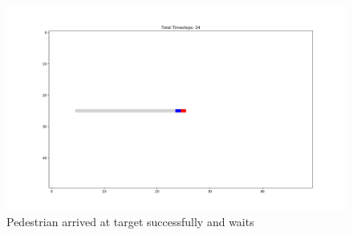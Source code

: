 \documentclass[10pt,a4paper]{article}
\begin{document}
\begin{figure}
    \centering
    \includegraphics[width=\textwidth]{pictures/End.png}
    \caption{Pedestrian arrived at target successfully and waits}
    \label{fig:end_2}
\end{figure}
\end{document}
